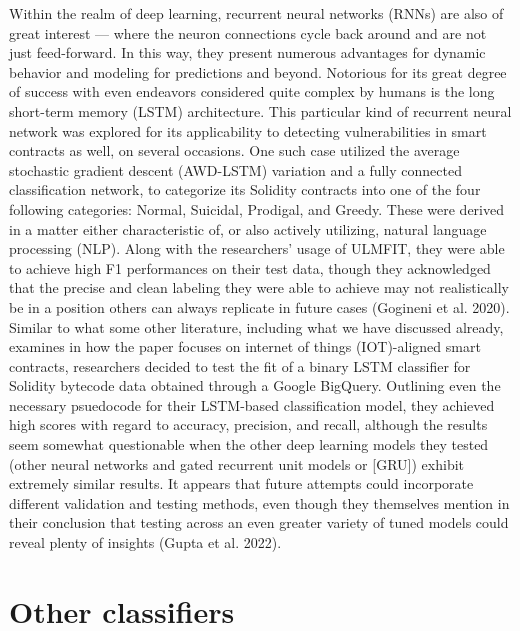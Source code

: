 \documentclass[
  11pt,
]{article}
\begin{document}
Within the realm of deep learning, recurrent neural networks (RNNs) are
also of great interest --- where the neuron connections cycle back
around and are not just feed-forward. In this way, they present numerous
advantages for dynamic behavior and modeling for predictions and beyond.
Notorious for its great degree of success with even endeavors considered
quite complex by humans is the long short-term memory (LSTM)
architecture. This particular kind of recurrent neural network was
explored for its applicability to detecting vulnerabilities in smart
contracts as well, on several occasions. One such case utilized the
average stochastic gradient descent (AWD-LSTM) variation and a fully
connected classification network, to categorize its Solidity contracts
into one of the four following categories: Normal, Suicidal, Prodigal,
and Greedy. These were derived in a matter either characteristic of, or
also actively utilizing, natural language processing (NLP). Along with
the researchers' usage of ULMFIT, they were able to achieve high F1
performances on their test data, though they acknowledged that the
precise and clean labeling they were able to achieve may not
realistically be in a position others can always replicate in future
cases (Gogineni et al. 2020). Similar to what some other literature,
including what we have discussed already, examines in how the paper
focuses on internet of things (IOT)-aligned smart contracts, researchers
decided to test the fit of a binary LSTM classifier for Solidity
bytecode data obtained through a Google BigQuery. Outlining even the
necessary psuedocode for their LSTM-based classification model, they
achieved high scores with regard to accuracy, precision, and recall,
although the results seem somewhat questionable when the other deep
learning models they tested (other neural networks and gated recurrent
unit models or {[}GRU{]}) exhibit extremely similar results. It appears
that future attempts could incorporate different validation and testing
methods, even though they themselves mention in their conclusion that
testing across an even greater variety of tuned models could reveal
plenty of insights (Gupta et al. 2022).

\hypertarget{other-classifiers}{%
\section{Other classifiers}\label{other-classifiers}}
\end{document}

